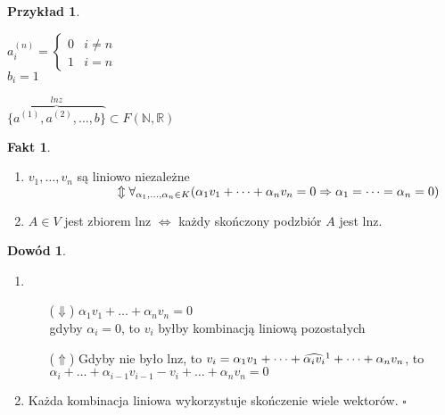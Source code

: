 \documentclass[12pt,a4paper]{article}
\newcommand{\RR}{\mathbb{R}}
\renewcommand{\qed}{$\square$}
\theoremstyle{plain}
\theoremstyle{definition}
\newtheorem{ft}{Fakt}[section]
\theoremstyle{definition}
\theoremstyle{definition}
\theoremstyle{definition}
\newtheorem*{dd}{Dowód}
\theoremstyle{definition}
\newtheorem*{prz}{Przykład}
\theoremstyle{definition}
\theoremstyle{definition}
\theoremstyle{definition}
\begin{document}
\begin{prz}
    ~\\
    \begin{minipage}[t]{0.5\textwidth}
    $
    a^{(n)}_i = \begin{cases}
                0 & i \neq n \\ 
                1 & i = n
              \end{cases}
    $ \\
    $b_i = 1$
    \end{minipage}%
    \begin{minipage}[t]{0.5\textwidth}
       $\overbrace{\{a^{(1)},a^{(2)},\dots,b\}}^{lnz} \subset F(\mathbb{N},\RR)$
        
    \end{minipage}
\end{prz}

\newpage

\begin{ft} \hfill
    \begin{enumerate}[{(}1{)}]
         \item $v_1,\dots,v_n$ są liniowo niezależne \\
        $ \hspace*{25mm} \Updownarrow 
        \\ 
        \forall _{\alpha_1,\dots,\alpha_n\in K} (\alpha_1v_1+\dots+\alpha_nv_n = 0 \Rightarrow \alpha_1 = \dots = \alpha_n =0)$ 
        \item $A \in V $ jest zbiorem lnz $\iff$ każdy skończony podzbiór $A$ jest lnz.
    \end{enumerate}
\end{ft}
\begin{dd} \hfill 
    \begin{enumerate}[{(}1{)}]
        \item \begin{itemize}
            \item[($\Downarrow$)] $\alpha_1v_1 + \dots + \alpha_nv_n = 0$ \\
                gdyby $\alpha_i = 0 $, to $v_i$ byłby kombinacją liniową pozostałych \lightning
            \item[($\Uparrow$)] Gdyby nie było lnz, to $v_i = \alpha_1v_1+\dots+ \widehat{\alpha_i v_i} \text{\footnotemark} +\dots + \alpha_nv_n$, to \\ $\alpha_i + \dots + \alpha_{i-1}v_{i-1} - v_i + \dots + \alpha_nv_n = 0 $ \lightning
        \end{itemize}
        \item Każda kombinacja liniowa wykorzystuje skończenie wiele wektorów. \qed
    \end{enumerate}
\end{dd} 
\end{document}
